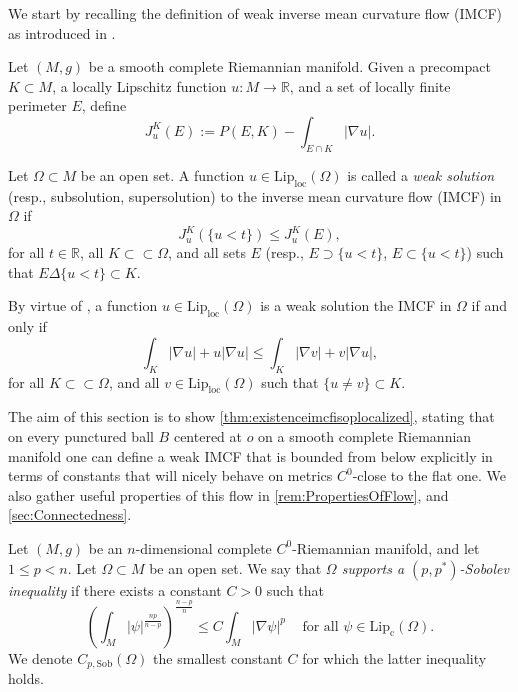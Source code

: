 \documentclass[a4paper,12pt,reqno]{amsart}
\numberwithin{equation}{section}
\theoremstyle{plain}
\theoremstyle{definition}
\theoremstyle{remark}
\begin{document}
{We start by recalling the definition of weak inverse mean curvature flow (IMCF) as introduced in \cite{HuiskenIlmanen}.
\begin{definition}\label{def:WeakIMCFLevelSet}
    Let $(M,g)$ be a smooth complete Riemannian manifold. Given a precompact  $K\subset M$, a locally Lipschitz function $u:M\to\mathbb R$, and a set of locally finite perimeter $E$, define
    \[
    J_u^K(E):=P(E,K)-\int_{E\cap K}|\nabla u|.
    \]

    Let $\Omega\subset M$ be an open set. A function $u\in\mathrm{Lip}_{\mathrm{loc}}(\Omega)$ is called a \textit{weak solution} (resp., subsolution, supersolution) to the inverse mean curvature flow (IMCF) in $\Omega$ if
\[
J_u^K(\{u<t\})\leq J_u^K(E),
\]
for all $t\in\mathbb R$, all $K\subset\subset \Omega$, and all sets $E$ (resp., $E\supset \{u<t\}$, $E\subset \{u<t\}$) such that $E\Delta \{u<t\}\subset K$.
\end{definition}

\begin{remark}
    By virtue of \cite[Lemma 1.1]{HuiskenIlmanen}, a function $u\in\mathrm{Lip}_{\mathrm{loc}}(\Omega)$ is a weak solution the IMCF in $\Omega$ if and only if
    \begin{equation}\label{eqn:IMCFFunctionFormulation}
    \int_K |\nabla u|+u|\nabla u| \leq \int_K |\nabla v|+v|\nabla u|,
    \end{equation}
    for all $K\subset\subset\Omega$, and all $v\in\mathrm{Lip}_{\mathrm{loc}}(\Omega)$ such that $\{u\neq v\}\subset K$.
\end{remark}
The aim of this section is to show \cref{thm:existenceimcfisoplocalized}, stating that on every punctured ball $B$ centered at $o$ on a smooth complete Riemannian manifold one can define a weak IMCF that is bounded from below explicitly in terms of constants that will nicely behave on metrics $C^0$-close to the flat one. We also gather useful properties of this flow in \cref{rem:PropertiesOfFlow}, and \cref{sec:Connectedness}.
\begin{definition}\label{def:SobolevInequality}
    Let $(M,g)$ be an $n$-dimensional complete $C^0$-Riemannian manifold, and let $1\leq p<n$. Let $\Omega\subset M$ be an open set. We say that \textit{$\Omega$ supports a $(p,p^*)$-Sobolev inequality} if there exists a constant $C>0$ such that
    \begin{equation}\label{eqn:pSobolevInequality}
    \left(\int_M |\psi|^{\frac{np}{n-p}}\right)^{\frac{n-p}{n}} \leq C\int_M |\nabla\psi|^p\,\quad \text{for all $\psi\in\mathrm{Lip}_{\mathrm{c}}(\Omega)$}.
    \end{equation}
    We denote $C_{p,\mathrm{Sob}}(\Omega)$ the smallest constant $C$ for which the latter inequality holds.
\end{definition}

}
\end{document}
